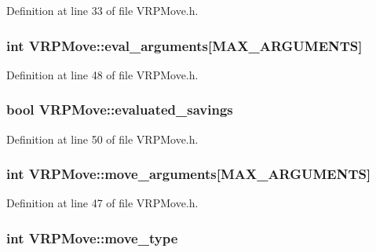 Definition at line 33 of file VRPMove.h.

\hypertarget{class_v_r_p_move_a4328a652db3307d16e8a0a09df47c3bb}{
\subsubsection[{eval\_\-arguments}]{\setlength{\rightskip}{0pt plus 5cm}int {\bf VRPMove::eval\_\-arguments}\mbox{[}MAX\_\-ARGUMENTS\mbox{]}}}
\label{class_v_r_p_move_a4328a652db3307d16e8a0a09df47c3bb}


Definition at line 48 of file VRPMove.h.

\hypertarget{class_v_r_p_move_ad6a7403e76e701bde510f50afecfa50e}{
\subsubsection[{evaluated\_\-savings}]{\setlength{\rightskip}{0pt plus 5cm}bool {\bf VRPMove::evaluated\_\-savings}}}
\label{class_v_r_p_move_ad6a7403e76e701bde510f50afecfa50e}


Definition at line 50 of file VRPMove.h.

\hypertarget{class_v_r_p_move_a1a900aa1d2953581afb639b6d899d59c}{
\subsubsection[{move\_\-arguments}]{\setlength{\rightskip}{0pt plus 5cm}int {\bf VRPMove::move\_\-arguments}\mbox{[}MAX\_\-ARGUMENTS\mbox{]}}}
\label{class_v_r_p_move_a1a900aa1d2953581afb639b6d899d59c}


Definition at line 47 of file VRPMove.h.

\hypertarget{class_v_r_p_move_aceb961e33e98ba0060b48a9f9c8a77e6}{
\subsubsection[{move\_\-type}]{\setlength{\rightskip}{0pt plus 5cm}int {\bf VRPMove::move\_\-type}}}
\label{class_v_r_p_move_aceb961e33e98ba0060b48a9f9c8a77e6}


